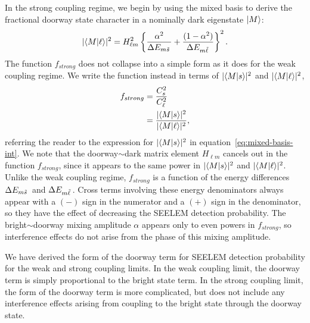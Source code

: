 In the strong coupling regime, we begin by using the mixed basis to
derive the fractional doorway state character in a nominally dark
eigenstate $\mathinner{|{M}\rangle}$:
\begin{equation}
  \lvert \mathinner{\langle{M|\ell}\rangle} \rvert^2 = 
  H_{\ell m}^2 \left \lbrace
    \frac{\alpha^2}{\Delta E_{m \tilde{s}\,}} +
    \frac{(1-\alpha^2)}{\Delta E_{m \tilde{\ell}\,}}
  \right \rbrace^2.
\end{equation}
The function $f_{strong}$ does not collapse into a simple form as it
does for the weak coupling regime.  We write the function instead in
terms of $\lvert \mathinner{\langle{M|s}\rangle} \rvert^2$ and $\lvert \mathinner{\langle{M|\ell}\rangle}
\rvert^2$,
\begin{equation}
  \begin{split}
    f_{strong} &= \frac{C_s^2}{C_{\ell}^2}\\
    &= \frac{\lvert \mathinner{\langle{M|s}\rangle} \rvert^2}
    {\lvert \mathinner{\langle{M|\ell}\rangle} \rvert^2},\\
  \end{split}
\end{equation}
referring the reader to the expression for $\lvert \mathinner{\langle{M|s}\rangle}
\rvert^2$ in equation~\ref{eq:mixed-basis-int}.  We note that the
doorway$\sim$dark matrix element $H_{\ell m}$ cancels out in the
function $f_{strong}$, since it appears to the same power in $\lvert
\mathinner{\langle{M|s}\rangle} \rvert^2$ and $\lvert \mathinner{\langle{M|\ell}\rangle} \rvert^2$.  Unlike
the weak coupling regime, $f_{strong}$ is a function of the energy
differences $\Delta E_{m \tilde{s}\,}$ and $\Delta E_{m \tilde{\ell}\,}$.  Cross terms
involving these energy denominators always appear with a $(-)$ sign in
the numerator and a $(+)$ sign in the denominator, so they have the
effect of decreasing the SEELEM detection probability.  The
bright$\sim$doorway mixing amplitude $\alpha$ appears only to even
powers in $f_{strong}$, so interference effects do not arise from the
phase of this mixing amplitude.  



We have derived the form of the doorway term for SEELEM detection
probability for the weak and strong coupling limits.  In the weak
coupling limit, the doorway term is simply proportional to the bright
state term.  In the strong coupling limit, the form of the doorway
term is more complicated, but does not include any interference effects
arising from coupling to the bright state through the doorway state.

